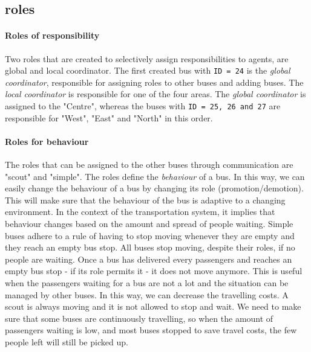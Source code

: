 \documentclass{article}
\begin{document}
\subsection{roles}
\paragraph{Roles of responsibility}
Two roles that are created to selectively assign responsibilities to agents, are global and local coordinator. The first created bus with \texttt{ID = 24} is the \textit{global coordinator}, responsible for assigning roles to other buses and adding buses. The \textit{local coordinator} is responsible for one of the four areas. The \textit{global coordinator} is assigned to the "Centre", whereas the buses with \texttt{ID = 25, 26 and 27} are responsible for "West", "East" and "North" in this order.
\newline
{}
\paragraph{Roles for behaviour}
The roles that can be assigned to the other buses through communication are "scout" and "simple". The roles define the \textit{behaviour} of a bus. In this way, we can easily change the behaviour of a bus by changing its role (promotion/demotion). This will make sure that the behaviour of the bus is adaptive to a changing environment. In the context of the transportation system, it implies that behaviour changes based on the amount and spread of people waiting.
\newline
Simple buses adhere to a rule of having to stop moving whenever they are empty and they reach an empty bus stop. All buses stop moving, despite their roles, if no people are waiting. Once a bus has delivered every passengers and reaches an empty bus stop - if its role permits it - it does not move anymore. This is useful when the passengers waiting for a bus are not a lot and the situation can be managed by other buses. In this way, we can decrease the travelling costs.
\newline
A scout is always moving and it is not allowed to stop and wait. We need to make sure that some buses are continuously travelling, so when the amount of passengers waiting is low, and most buses stopped to save travel costs, the few people left will still be picked up.
\end{document}
